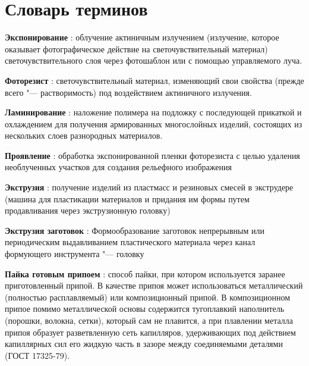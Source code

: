 \chapter*{Словарь терминов}             %



\textbf{Экспонирование} : облучение актиничным излучением (излучение, которое оказывает фотографическое действие на светочувствительный материал) светочувствительного слоя через фотошаблон или с помощью управляемого луча.

\textbf{Фоторезист} : светочувствительный материал, изменяющий свои свойства (прежде всего "--- растворимость) под воздействием актиничного излучения. 

\textbf{Ламинирование} : наложение полимера на подложку с последующей прикаткой и охлаждением для получения армированных многослойных изделий, состоящих из нескольких слоев разнородных материалов.

\textbf{Проявление} : обработка экспонированной пленки фоторезиста с целью удаления необлученных участков для создания рельефного изображения

\textbf{Экструзия} : получение изделий из пластмасс и резиновых смесей в экструдере (машина для пластикации материалов и придания им формы путем продавливания через экструзионную головку)

\textbf{Экструзия заготовок} : Формообразование заготовок непрерывным или периодическим выдавливанием пластического материала через канал формующего инструмента "--- головку 

\textbf{Пайка готовым припоем} : способ пайки, при котором используется заранее приготовленный припой. В качестве припоя может использоваться металлический (полностью расплавляемый) или композиционный припой. В композиционном припое помимо металлической основы содержится тугоплавкий наполнитель (порошки, волокна, сетки), который сам не плавится, а при плавлении металла припоя образует разветвленную сеть капилляров, удерживающих под действием капиллярных сил его жидкую часть в зазоре между соединяемыми деталями (ГОСТ 17325-79).
